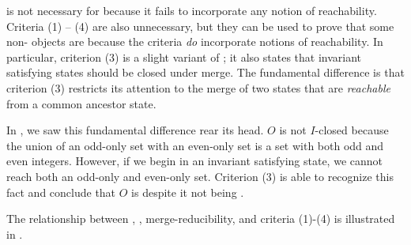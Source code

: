 \Invariantclosure{} is not necessary for \invariantconfluence{} because it
fails to incorporate any notion of reachability. Criteria (1) -- (4) are also
unnecessary, but they can be used to prove that some non-\invariantclosed{}
objects are \invariantconfluent{} because the criteria \emph{do} incorporate
notions of reachability. In particular, criterion (3) is a slight variant of
\invariantclosure{}; it also states that invariant satisfying states should be
closed under merge. The fundamental difference is that criterion (3) restricts
its attention to the merge of two states that are \emph{reachable} from a
common ancestor state.

In , we saw this fundamental difference rear its head. $O$
is not $I$-closed because the union of an odd-only set with an even-only set is
a set with both odd and even integers. However, if we begin in an invariant
satisfying state, we cannot reach both an odd-only and even-only set.
Criterion (3) is able to recognize this fact and conclude that $O$ is
\invariantconfluent{} despite it not being \invariantclosed{}.

The relationship between \invariantconfluence{}, \invariantclosure{},
merge-reducibility, and criteria (1)-(4) is illustrated in
.
